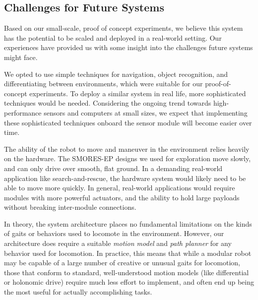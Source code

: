 \documentclass[journal]{IEEEtran}
\newcommand{\TODO}[1]{ {\bf \textcolor{red}{TODO:} #1 }}
\begin{document}
%
\subsection{Challenges for Future Systems}
%
Based on our small-scale, proof of concept experiments, we believe this system has the potential to be scaled and deployed in a real-world setting. Our experiences have provided us with some insight into the challenges future systems might face.

We opted to use simple techniques for navigation, object recognition, and differentiating between environments, which were suitable for our proof-of-concept experiments. To deploy a similar system in real life, more sophisticated techniques would be needed. Considering the ongoing trend towards high-performance sensors and computers at small sizes, we expect that implementing these sophisticated techniques onboard the sensor module will become easier over time.

The ability of the robot to move and maneuver in the environment relies heavily on the hardware.  The SMORES-EP designs we used for exploration move slowly, and can only drive over smooth, flat ground.  In a demanding real-world application like search-and-rescue, the hardware system would likely need to be able to move more quickly.  In general, real-world applications would require modules with more powerful actuators, and the ability to hold large payloads without breaking inter-module connections.

In theory, the system architecture places no fundamental limitations on the kinds of gaits or behaviors used to locomote in the environment.  However, our architecture does require a suitable \textit{motion model} and \textit{path planner} for any behavior used for locomotion.  In practice, this means that while a modular robot may be capable of a large number of creative or unusual gaits for locomotion, those that conform to standard, well-understood motion models (like differential or holonomic drive) require much less effort to implement, and often end up being the most useful for actually accomplishing tasks.
\end{document}
